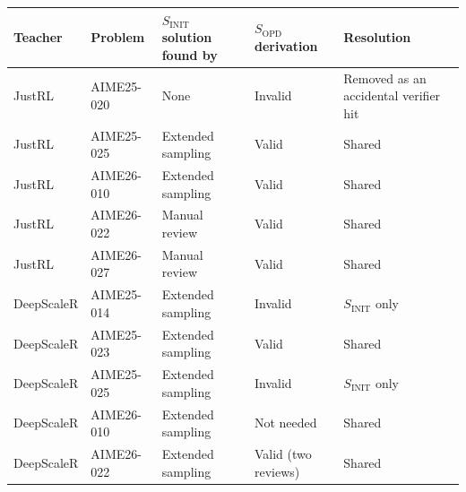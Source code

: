 \begin{center}
\label{tab:appendix_coverage_audit}
\centering
\small
\setlength{\tabcolsep}{3.5pt}
\begin{tabular}{@{}llp{}p{}p{}@{}}
\toprule
Teacher & Problem & $S_{\mathrm{INIT}}$ solution found by & $S_{\mathrm{OPD}}$ derivation & Resolution \\
\midrule
JustRL & AIME25-020 & None & Invalid & Removed as an accidental verifier hit \\
JustRL & AIME25-025 & Extended sampling & Valid & Shared \\
JustRL & AIME26-010 & Extended sampling & Valid & Shared \\
JustRL & AIME26-022 & Manual review & Valid & Shared \\
JustRL & AIME26-027 & Manual review & Valid & Shared \\
\midrule
DeepScaleR & AIME25-014 & Extended sampling & Invalid & $S_{\mathrm{INIT}}$ only \\
DeepScaleR & AIME25-023 & Extended sampling & Valid & Shared \\
DeepScaleR & AIME25-025 & Extended sampling & Invalid & $S_{\mathrm{INIT}}$ only \\
DeepScaleR & AIME26-010 & Extended sampling & Not needed & Shared \\
DeepScaleR & AIME26-022 & Extended sampling & Valid (two reviews) & Shared \\
\bottomrule
\end{tabular}
\end{center}
